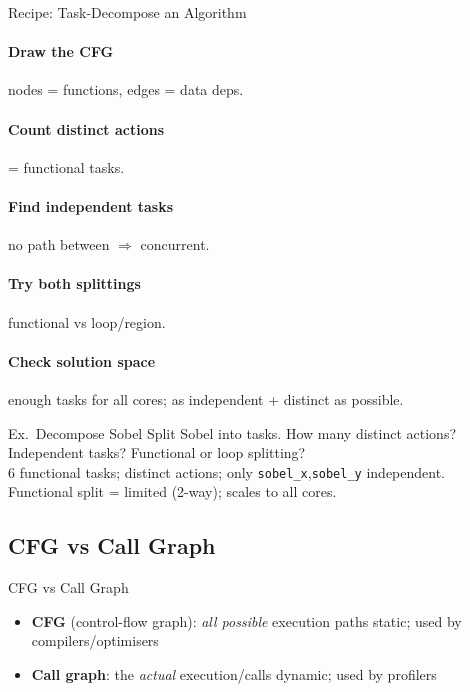 \begin{KR}{Recipe: Task-Decompose an Algorithm}
    \paragraph{Draw the CFG} nodes = functions, edges = data deps.
    \paragraph{Count distinct actions} = functional tasks.
    \paragraph{Find independent tasks} no path between $\Rightarrow$ concurrent.
    \paragraph{Try both splittings} functional vs loop/region.
    \paragraph{Check solution space} enough tasks for all cores; as independent + distinct as possible.
\end{KR}

\begin{example2}{Ex.\ Decompose Sobel}
    Split Sobel into tasks. How many distinct actions? Independent tasks? Functional or loop splitting?
     \\ 
    6 functional tasks;  distinct actions; only \texttt{sobel\_x},\texttt{sobel\_y} independent. Functional split = limited (2-way);  scales to all cores.
\end{example2}

\multend

\subsection{CFG vs Call Graph}

\begin{definition}{CFG vs Call Graph}
    \begin{itemize}
        \item \textbf{CFG} (control-flow graph): \emph{all possible} execution paths static; used by compilers/optimisers
        \item \textbf{Call graph}: the \emph{actual} execution/calls dynamic; used by profilers
    \end{itemize}
\end{definition}

